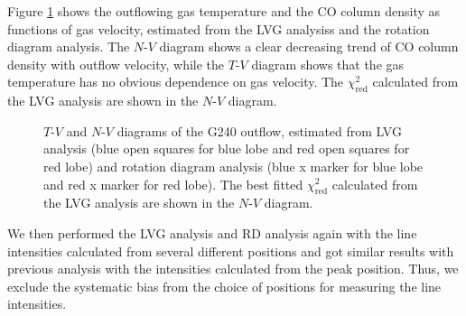 Figure \ref{fig:fig5} shows the outflowing gas temperature and the CO column density as functions of gas velocity, estimated from the LVG analysiss and the rotation diagram analysis. The $N$-$V$ diagram shows a clear decreasing trend of CO column density with outflow velocity, while the $T$-$V$ diagram shows that the gas temperature has no obvious dependence on gas velocity. The $\chi^2_{\mathrm{red}}$ calculated from the LVG analysis are shown in the $N$-$V$ diagram. 

\begin{figure}
\caption{$T$-$V$ and $N$-$V$ diagrams of the G240 outflow, estimated from LVG analysis (blue open squares for blue lobe and red open squares for red lobe) and rotation diagram analysis (blue x marker for blue lobe and red x marker for red lobe). The best fitted $\chi^2_{\mathrm{red}}$ calculated from the LVG analysis are shown in the $N$-$V$ diagram. \label{fig:fig5}}
\end{figure}

We then performed the LVG analysis and RD analysis again with the line intensities calculated from several different positions and got similar results with previous analysis with the intensities calculated from the peak position. Thus, we exclude the systematic bias from the choice of positions for measuring the line intensities.
